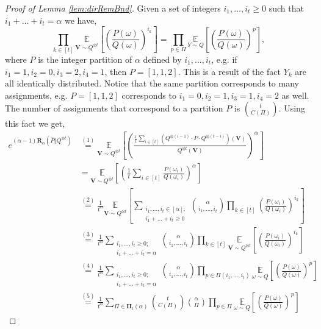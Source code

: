 \documentclass{article}
\theoremstyle{plain}
\theoremstyle{definition}
\newcommand{\eqExp}[2]{\overset{(#1)}{#2}}
\newcommand{\outRV}{Y}
\newcommand{\viewRV}{\boldsymbol{V}}
\newcommand{\expect}[2]{\underset{#1}{\mathbb{E}} \left[#2 \right]}
\newcommand{\Renyi}[1]{\boldsymbol{R}_{#1}}
\newcommand{\RenyiDiv}[3]{\Renyi{#1}\left(#2 \Vert #3 \right)}
\begin{document}
\begin{proof} [Proof of Lemma \ref{lem:dirRemBnd}]
    Given a set of integers $i_{1}, \ldots, i_{t} \ge 0$ such that $i_{1} + \ldots + i_{t} = \alpha$ 
    we have,
    \[
        \prod_{k \in [t]} \expect{\viewRV \sim Q^{\otimes t}}{\left(\frac{P(\omega)}{Q(\omega)} \right)^{i_{k}}} = \prod_{p \in \Pi} \expect{\outRV \sim Q}{\left(\frac{P(\omega)}{Q(\omega)} \right)^{p}},
    \]
    where $P$ is the integer partition of $\alpha$ defined by $i_{1}, \ldots, i_{t}$, e.g. if $i_{1} = 1, i_{2} = 0, i_{3} = 2, i_{4} = 1$, then $P = [1, 1, 2]$. This is a result of the fact $\outRV_{k}$ are all identically distributed. Notice that the same partition corresponds to many assignments, e.g. $P = [1, 1, 2]$ corresponds to $i_{1} = 0, i_{2} = 1, i_{3} = 1, i_{4} = 2$ as well. The number of assignments that correspond to a partition $P$ is $\binom{t}{C(\Pi)}$. Using this fact we get,
    \begin{align*}
        e^{(\alpha-1)\RenyiDiv{\alpha}{\bar{P}}{Q^{\otimes t}}} & \eqExp{1}{=} \expect{\viewRV \sim Q^{\otimes t}}{\left(\frac{\frac{1}{t} \sum_{i \in [t]} \left(Q^{\otimes (i-1)} \cdot P \cdot Q^{\otimes (t-i)} \right)(\viewRV)}{Q^{\otimes t}(\viewRV)} \right)^{\alpha}}
        \\ & = \expect{\viewRV \sim Q^{\otimes t}}{\left(\frac{1}{t}\sum_{i \in [t]} \frac{P(\omega_{i})}{Q(\omega_{i})} \right)^{\alpha}}
        \\ & \eqExp{2}{=} \frac{1}{t^{\alpha}} \expect{\viewRV \sim Q^{\otimes t}}{\sum_{\substack{i_{1}, \ldots, i_{t} \in [\alpha]; \\ i_{1} + \ldots + i_{t} \ge 0}} \binom{\alpha}{i_{1}, \ldots, i_{t}} \prod_{k \in [t]} \left(\frac{P(\omega_{i})}{Q(\omega_{i})} \right)^{i_{k}}}
        \\ & \eqExp{3}{=} \frac{1}{t^{\alpha}} \sum_{\substack{i_{1}, \ldots, i_{t} \ge 0; \\ i_{1} + \ldots + i_{t} = \alpha}} \binom{\alpha}{i_{1}, \ldots, i_{t}} \prod_{k \in [t]} \expect{\viewRV \sim Q^{\otimes t}}{\left(\frac{P(\omega_{i})}{Q(\omega_{i})} \right)^{i_{k}}}
        \\ & \eqExp{4}{=} \frac{1}{t^{\alpha}} \sum_{\substack{i_{1}, \ldots, i_{t} \ge 0; \\ i_{1} + \ldots + i_{t} = \alpha}} \binom{\alpha}{i_{1}, \ldots, i_{t}} \prod_{p \in \Pi(i_{1}, \ldots, i_{t})} \expect{\omega \sim Q}{\left(\frac{P(\omega)}{Q(\omega)} \right)^{p}}
        \\ & \eqExp{5}{=} \frac{1}{t^{\alpha}} \sum_{\Pi \in \boldsymbol{\Pi}_{t}(\alpha)} \binom{t}{C(\Pi)} \binom{\alpha}{\Pi} \prod_{p \in \Pi} \expect{\omega \sim Q}{\left(\frac{P(\omega)}{Q(\omega)} \right)^{p}}

\end{align*}
\end{proof}
\end{document}
